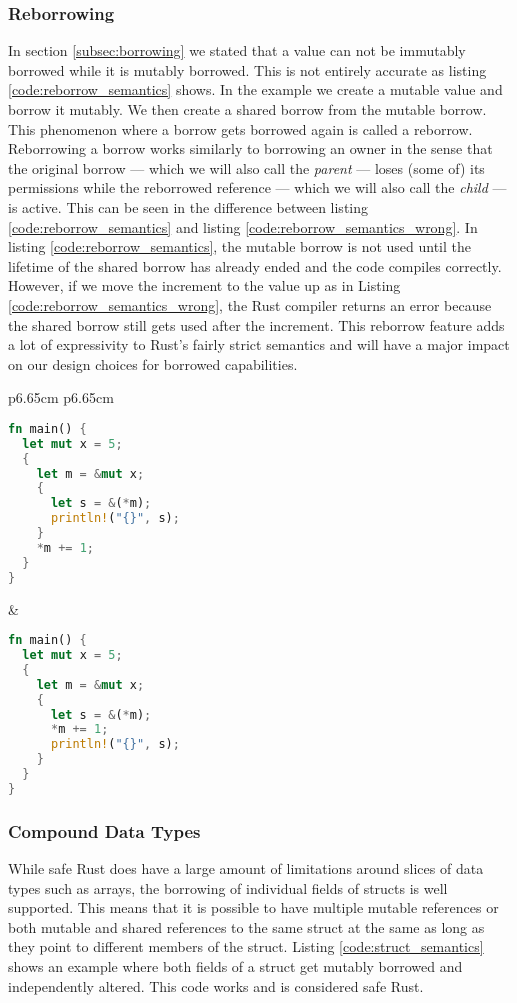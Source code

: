 \subsubsection{Reborrowing}
\label{sec:backgroundreborrow}
In section \ref{subsec:borrowing} we stated that a value can not be immutably borrowed while it is mutably borrowed.
This is not entirely accurate as listing \ref{code:reborrow_semantics} shows.
In the example we create a mutable value and borrow it mutably.
We then create a shared borrow from the mutable borrow.
This phenomenon where a borrow gets borrowed again is called a reborrow.
Reborrowing a borrow works similarly to borrowing an owner in the sense that the original borrow --- which we will also call the \textit{parent} --- loses (some of) its permissions while the reborrowed reference --- which we will also call the \textit{child} --- is active.
This can be seen in the difference between listing \ref{code:reborrow_semantics} and listing \ref{code:reborrow_semantics_wrong}.
In listing \ref{code:reborrow_semantics}, the mutable borrow is not used until the lifetime of the shared borrow has already ended and the code compiles correctly.
However, if we move the increment to the value up as in Listing \ref{code:reborrow_semantics_wrong}, the Rust compiler returns an error because the shared borrow still gets used after the increment.
This reborrow feature adds a lot of expressivity to Rust's fairly strict semantics and will have a major impact on our design choices for borrowed capabilities.

\noindent
\begin{tabular}{p{6.65cm} p{6.65cm}}
    \begin{lstlisting}[language=Rust,frame=single,caption=Reborrow Example,label=code:reborrow_semantics]
fn main() {
  let mut x = 5;
  {
    let m = &mut x;
    {
      let s = &(*m);
      println!("{}", s);
    }
    *m += 1;
  }
}
    \end{lstlisting}

    &

    \begin{lstlisting}[language=Rust,frame=single,caption=Wrong Example,label=code:reborrow_semantics_wrong]
fn main() {
  let mut x = 5;
  {
    let m = &mut x;
    {
      let s = &(*m);
      *m += 1;
      println!("{}", s);
    }
  }
}
    \end{lstlisting}
\end{tabular}

\subsubsection{Compound Data Types}
While safe Rust does have a large amount of limitations around slices of data types such as arrays, the borrowing of individual fields of structs is well supported.
This means that it is possible to have multiple mutable references or both mutable and shared references to the same struct at the same as long as they point to different members of the struct.
Listing \ref{code:struct_semantics} shows an example where both fields of a struct get mutably borrowed and independently altered.
This code works and is considered safe Rust.


